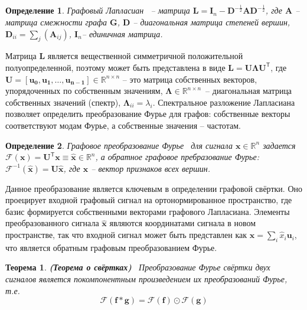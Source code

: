 \documentclass[14pt]{extarticle}
\newtheorem{Th}{Теорема}
\newtheorem{Def}{Определение}
\begin{document}
\begin{Def}
	\textit{Графовый Лапласиан}~\cite{Chung:1997} -- матрица $\mathbf{L}=\mathbf{I}_{n}-\mathbf{D}^{-\frac{1}{2}} \mathbf{A} \mathbf{D}^{-\frac{1}{2}}$, где $\mathbf{A}$ -- матрица смежности графа $\mathbf{G}$,  $\mathbf{D}$ -- диагональная матрица степеней вершин, $\mathbf{D}_{i i}=\sum_{j}\left(\mathbf{A}_{i j}\right)$, $\mathbf{I}_{n}$-- единичная матрица.
\end{Def}

Матрица $\mathbf{L}$ является вещественной симметричной положительной полуопределенной, поэтому может быть представлена в виде  $\mathbf{L}=\mathbf{U} \boldsymbol{\Lambda} \mathbf{U}^{\mathsf{T}} $, где $\mathbf{U}=\left[\mathbf{u}_{\mathbf{0}}, \mathbf{u}_{\mathbf{1}}, \dots, \mathbf{u}_{\mathbf{n}-\mathbf{1}}\right] \in \mathbb{R}^{n \times n}$ -- это матрица собственных векторов, упорядоченных по собственным значениям, $\boldsymbol{\Lambda} \in \mathbb{R}^{n \times n}$~-- диагональная матрица собственных значений (спектр), $\boldsymbol{\Lambda}_{i i}=\lambda_{i}$. Спектральное разложение Лапласиана позволяет определить преобразование Фурье для графов: собственные векторы соответствуют модам Фурье, а собственные значения -- частотам. 

\begin{Def}
	\textit{Графовое преобразование Фурье}~\cite{journals/spm/ShumanNFOV13} для сигнала $\mathbf{x} \in \mathbb{R}^{n}$ задается $\mathscr{F}(\mathbf{x})=\mathbf{U}^{\mathsf{T}} \mathbf{x} \equiv \hat{\mathbf{x}} \in \mathbb{R}^{n}$, а обратное графовое пребразование Фурье: $\mathscr{F}^{-1}(\hat{\mathbf{x}})=\mathbf{U} \hat{\mathbf{x}}$, где $\mathbf{x}$ -- вектор признаков всех вершин.
\end{Def}

Данное преобразование является ключевым в определении графовой свёртки. Оно проецирует входной графовый сигнал на ортонормированное пространство, где базис формируется собственными векторами графового Лапласиана. Элементы преобразованного сигнала $ \hat{\mathbf{x}}$ являются координатами сигнала в новом пространстве, так что входной сигнал может быть представлен как $\mathbf{x}=\sum_{i} \hat{x}_{i} \mathbf{u}_{i}$, что является обратным графовым преобразованием Фурье.

\begin{Th}
	\textbf{(Теорема о свёртках)}~\cite{10.5555/1525499} Преобразование Фурье свёртки двух сигналов является покомпонентным произведением их преобразований Фурье, т.е. $$\mathscr{F}\left( \mathbf{f} * \mathbf{g}\right) =\mathscr{F}(\mathbf{f}) \odot \mathscr{F}(\mathbf{g})$$
	\label{conv_theorem}
\end{Th}
\end{document}
